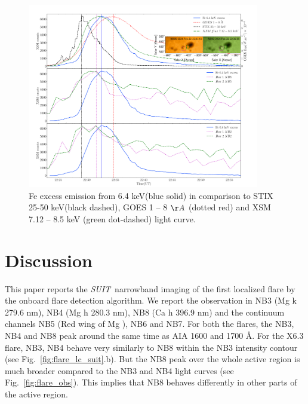 \documentclass[lineno, pdflatex,sn-mathphys-ay]{sn-jnl}%
\newcommand{\suit}{{\it{SUIT}}}
\begin{document}
\begin{figure}
\centering
    \includegraphics[trim={1.7cm 0.5cm 2.3cm 1.9cm}, clip, width=0.9\textwidth]{fe_excess_4.pdf}
    \caption{Fe excess emission from 6.4 keV(blue solid) in comparison to STIX 25-50 keV(black dashed), GOES 1 {--} 8 $\AA$ (dotted red) and XSM 7.12 {--} 8.5 keV (green dot-dashed) light curve.}
    \label{fig:fe_excess}
\end{figure}

\section*{Discussion}\label{sec:dis}

This paper reports the \suit~narrowband imaging of the first localized flare by the onboard flare detection algorithm. We report the observation in NB3 (Mg  k 279.6 nm), NB4 (Mg  h 280.3 nm), NB8 (Ca  h 396.9 nm) and the continuum channels NB5 (Red wing of Mg ), NB6 and NB7. For both the flares, the NB3, NB4 and NB8 peak around the same time as AIA 1600 and 1700 {\AA}. For the X6.3 flare, NB3, NB4 behave very similarly to NB8 within the NB3 intensity contour (see Fig.~\ref{fig:flare_lc_suit}.b). But the NB8 peak over the whole active region is much broader compared to the NB3 and NB4 light curves (see Fig.~\ref{fig:flare_obs}). This implies that NB8 behaves differently in other parts of the active region.
\end{document}
